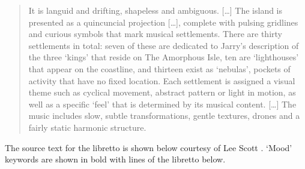\begin{quotation}
  It is languid and drifting, shapeless and ambiguous. [\ldots] The island is presented as a quincuncial projection [\ldots], complete with pulsing gridlines and curious symbols that mark musical settlements. There are thirty settlements in total: seven of these are dedicated to Jarry's description of the three `kings' that reside on The Amorphous Isle, ten are `lighthouses' that appear on the coastline, and thirteen exist as `nebulas', pockets of activity that have no fixed location. Each settlement is assigned a visual theme such as cyclical movement, abstract pattern or light in motion, as well as a specific `feel' that is determined by its musical content. [\ldots] The music includes slow, subtle transformations, gentle textures, drones and a fairly static harmonic structure. 
\end{quotation}

The source text for the libretto is shown below courtesy of Lee Scott \autocite*{Scott2014}. `Mood' keywords are shown in bold with lines of the libretto below.

